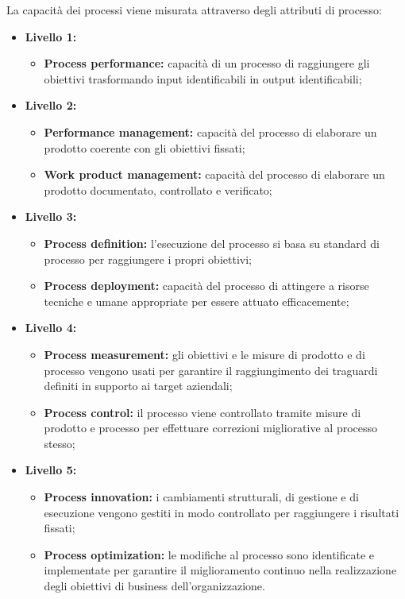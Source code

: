\documentclass[PianoDiQualifica.tex]{subfiles}
\begin{document}
La capacità dei processi viene misurata attraverso degli attributi di processo:
\begin{itemize}
	\item \textbf{Livello 1:}
	\begin{itemize}
		\item \textbf{Process performance:} capacità di un processo di raggiungere gli obiettivi trasformando input identificabili in output identificabili;
	\end{itemize}
	\item \textbf{Livello 2:}
	\begin{itemize}
		\item \textbf{Performance management:} capacità del processo di elaborare un prodotto coerente con gli obiettivi fissati;
		\item \textbf{Work product management:} capacità del processo di elaborare un prodotto documentato, controllato e verificato;
	\end{itemize}
	\item \textbf{Livello 3:}
	\begin{itemize}
		\item \textbf{Process definition:} l'esecuzione del processo si basa su standard di processo per raggiungere i propri obiettivi;
		\item \textbf{Process deployment:} capacità del processo di attingere a risorse tecniche e umane appropriate per essere attuato efficacemente;
	\end{itemize}
	\item \textbf{Livello 4:}
	\begin{itemize}
		\item \textbf{Process measurement:} gli obiettivi e le misure di prodotto e di processo vengono usati per garantire il raggiungimento dei traguardi definiti in supporto ai target aziendali;
		\item \textbf{Process control:} il processo viene controllato tramite misure di prodotto e processo per effettuare correzioni migliorative al processo stesso;
	\end{itemize}
	\item \textbf{Livello 5:}
	\begin{itemize}
		\item \textbf{Process innovation:} i cambiamenti strutturali, di gestione e di esecuzione vengono gestiti in modo controllato per raggiungere i risultati fissati;
		\item \textbf{Process optimization:} le modifiche al processo sono identificate e implementate per garantire il miglioramento continuo nella realizzazione degli obiettivi di business dell'organizzazione. 
	\end{itemize}
\end{itemize}
\end{document}
